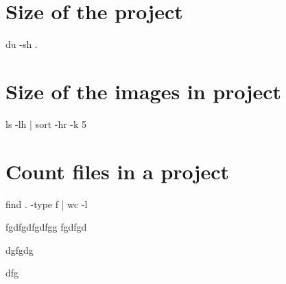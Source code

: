 \documentclass{article}
\begin{document}
\section{Size of the project}

\bash[stdout]
du -sh .
\END

\section{Size of the images in project}
\bash[stdout]
ls -lh | sort -hr -k 5
\END

\section{Count files in a project}
\bash[stdout]
find . -type f | wc -l
\END

fgdfgdfgdfgg
fgdfgd

dgfgdg

dfg
\end{document}
